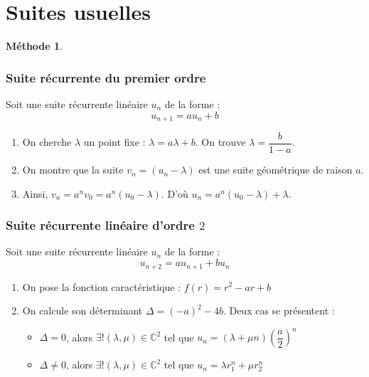 \documentclass[11pt,a4paper]{report}
\theoremstyle{definition}
\newtheorem{methode}[theorem]{Méthode}
\begin{document}
\section{Suites usuelles} %
\label{sec:suites_usuelles}
\begin{methode}
\subsubsection*{Suite récurrente du premier ordre}
     Soit une suite récurrente linéaire $u_n$ de la forme : 
     \[
        u_{n+1} = a u_n + b
     \]
     \begin{enumerate}
         \item On cherche $\lambda$ un point fixe : $\lambda = a\lambda + b$. On trouve $\lambda = \dfrac{b}{1 -a}$.
         \item On montre que la suite $v_n = (u_n - \lambda)$ est une suite géométrique de raison $a$.
         \item Ainsi, $v_n = a^n v_0 = a^n (u_0 - \lambda)$. D'où $u_n = a^n (u_0 - \lambda ) + \lambda$.
     \end{enumerate}
\subsubsection*{Suite récurrente linéaire d'ordre $2$}
Soit une suite récurrente linéaire $u_n$ de la forme : 
     \[
        u_{n+2} = a u_{n+1} + b u_n
     \]
     \begin{enumerate}
         \item On pose la fonction caractéristique : $f(r) = r^2 - a r + b$
         \item On calcule son déterminant $\Delta = (-a)^2 - 4b$. Deux cas se présentent : 
         \begin{itemize}
             \item $\Delta = 0$, alors $\exists ! (\lambda , \mu ) \in \ensuremath{\mathbb{C}}^2$ tel que $u_n = (\lambda + \mu n)\left( \dfrac{a}{2}\right)^n$
             \item $\Delta \neq 0$, alors $\exists ! (\lambda , \mu ) \in \ensuremath{\mathbb{C}}^2$ tel que $u_n = \lambda r_1^n + \mu r_2^n $
         \end{itemize}
     \end{enumerate}
\end{methode}


%
\end{document}
